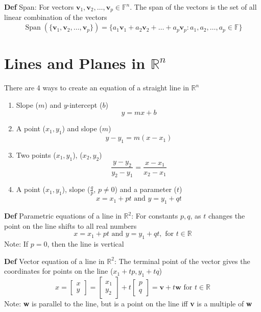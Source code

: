 \documentclass[11pt,notitlepage]{report}
\newcommand{\bb}[1]{\ensuremath{\mathbb{#1}}}
\newcommand{\tbf}[1]{\textbf{#1}}
\begin{document}
\textbf{Def} Span: For vectors $\tbf v_1, \tbf v_2, \dots, \tbf v_p \in \mathbb F^n$. The span of the vectors is the set of all linear combination of the vectors
$$\operatorname{Span}(\{\tbf v_1, \tbf v_2, \dots, \tbf v_p\}) = \{a_1\tbf v_1 + a_2\tbf v_2 + \dots + a_p\tbf v_p: a_1, a_2, \dots, a_p \in \bb F\}$$



\newpage

\section{Lines and Planes in \texorpdfstring{$\mathbb R^n$}{Rn}}

There are 4 ways to create an equation of a straight line in $\bb R^n$
\begin{enumerate}
    \item Slope ($m$) and $y$-intercept ($b$) $$y = mx+b$$
    \item A point ($x_1, y_1$) and slope ($m$) $$y - y_1 = m(x-x_1)$$
    \item Two points ($x_1, y_1$), ($x_2, y_2$) $$\frac{y-y_2}{y_2-y_1} = \frac{x-x_1}{x_2-x_1}$$
    \item A point ($x_1, y_1$), slope ($\frac{q}{p}$, $p\ne 0$) and a parameter ($t$) $$x = x_1 + pt \text{ and } y = y_1 + qt$$
\end{enumerate}

\textbf{Def} Parametric equations of a line in $\bb R^2$: For constants $p, q$, as $t$ changes the point on the line shifts to all real numbers
$$x = x_1 + pt \text{ and } y = y_1 + qt, \text{ for } t \in \bb R$$
\hspace*{5mm} Note: If $p=0$, then the line is vertical


\textbf{Def} Vector equation of a line in $\bb R^2$: The terminal point of the vector gives the coordinates for points on the line ($x_1 + tp, y_1 + tq$)
$$x = \begin{bmatrix}x\\y\end{bmatrix} = \begin{bmatrix}x_1\\y_2\end{bmatrix} + t \begin{bmatrix}p\\q\end{bmatrix} = \tbf v + t \tbf w \text{ for } t \in \bb R$$
\hspace*{5mm} Note: \tbf w is parallel to the line, but is a point on the line iff \tbf v is a multiple of \tbf w
\end{document}
